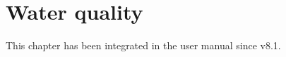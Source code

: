 \chapter{Water quality}
\label{ch:wat:qual}

This chapter has been integrated in the \waqtel user manual since v8.1.
